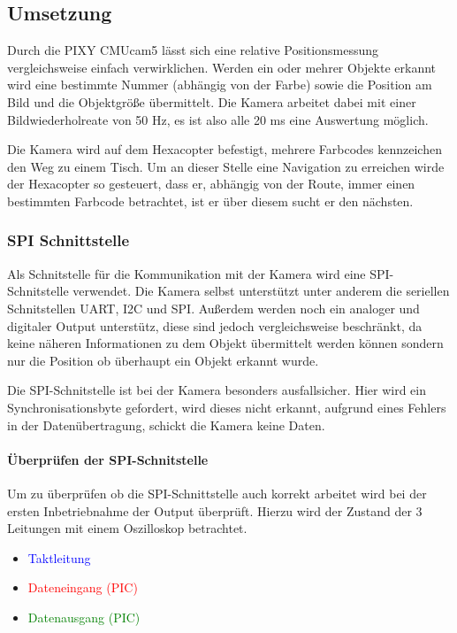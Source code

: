   \subsection{Umsetzung}
  Durch die PIXY CMUcam5 lässt sich eine relative Positionsmessung vergleichsweise einfach verwirklichen. Werden ein oder mehrer Objekte erkannt wird eine bestimmte Nummer (abhängig von der Farbe) sowie die Position am Bild und die Objektgröße übermittelt. Die Kamera arbeitet dabei mit einer Bildwiederholreate von 50 Hz, es ist also alle 20 ms eine Auswertung möglich.

  Die Kamera wird auf dem Hexacopter befestigt, mehrere Farbcodes kennzeichen den Weg zu einem Tisch. Um an dieser Stelle eine Navigation zu erreichen wirde der Hexacopter so gesteuert, dass er, abhängig von der Route, immer einen bestimmten Farbcode betrachtet, ist er über diesem sucht er den nächsten.

    \subsubsection{SPI Schnittstelle}
    Als Schnitstelle für die Kommunikation mit der Kamera wird eine SPI-Schnitstelle verwendet. Die Kamera selbst unterstützt unter anderem die seriellen Schnitstellen UART, I2C und SPI. Außerdem werden noch ein analoger und digitaler Output unterstütz, diese sind jedoch vergleichsweise beschränkt, da keine näheren Informationen zu dem Objekt übermittelt werden können sondern nur die Position \bzw ob überhaupt ein Objekt erkannt wurde.

    Die SPI-Schnitstelle ist bei der Kamera besonders ausfallsicher. Hier wird ein Synchronisationsbyte gefordert, wird dieses nicht erkannt, \zB aufgrund eines Fehlers in der Datenübertragung, schickt die Kamera keine Daten.

    \paragraph{Überprüfen der SPI-Schnitstelle}
    Um zu überprüfen ob die SPI-Schnittstelle auch korrekt arbeitet wird bei der ersten Inbetriebnahme der Output überprüft. Hierzu wird der Zustand der 3 Leitungen mit einem Oszilloskop betrachtet.
    \begin{itemize}
      \item \textcolor{blue}{Taktleitung}
      \item \textcolor{red}{Dateneingang (PIC)}
      \item \textcolor{green}{Datenausgang (PIC)}
    \end{itemize}

